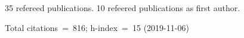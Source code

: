 35 refereed publications. 10 refeered publications as first author.

Total citations~=~816; h-index~=~15 (2019-11-06)